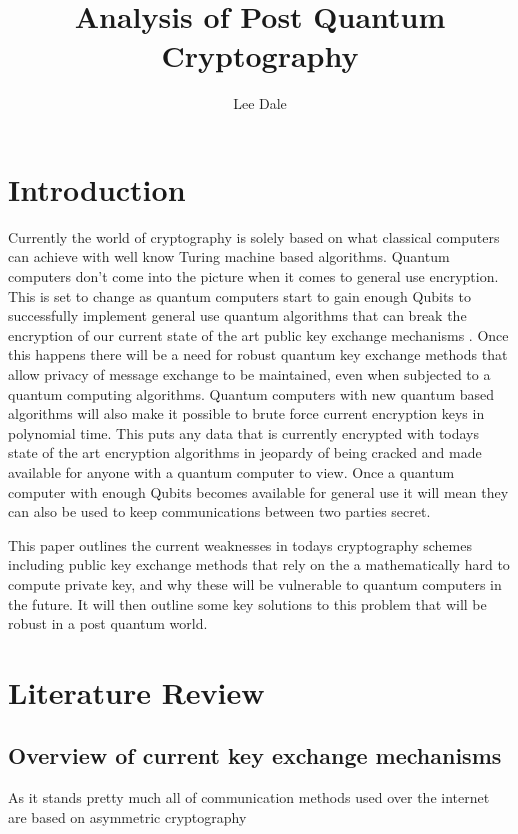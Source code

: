 \documentclass{article}
\title{Analysis of Post Quantum Cryptography}
\author{Lee Dale}
\begin{document}
\maketitle

\section{Introduction}

Currently the world of cryptography is solely based on what classical computers can achieve with well know Turing machine based algorithms. Quantum computers don't come into the picture when it comes to general use encryption. This  is set to change as quantum computers start to gain enough Qubits to successfully implement general use quantum algorithms that can break the encryption of our current state of the art public key exchange mechanisms \cite{Bellizia2021Post-QuantumDesign}. Once this happens there will be a need for robust quantum key exchange methods that allow privacy of message exchange to be maintained, even when subjected to a quantum computing algorithms. Quantum computers with new quantum based algorithms will also make it possible to brute force current encryption keys in polynomial time. This puts any data that is currently encrypted with todays state of the art encryption algorithms in jeopardy of being cracked and made available for anyone with a quantum computer to view. Once a quantum computer with enough Qubits becomes available for general use it will mean they can also be used to keep communications between two parties secret.

This paper outlines the current weaknesses in todays cryptography schemes including public key exchange methods that rely on the a mathematically hard to compute private key, and why these will be vulnerable to quantum computers in the future. It will then outline some key solutions to this problem that will be robust in a post quantum world. 

\section{Literature Review}

\subsection{Overview of current key exchange mechanisms}
As it stands pretty much all of  communication methods used over the internet are based on asymmetric cryptography
\end{document}
